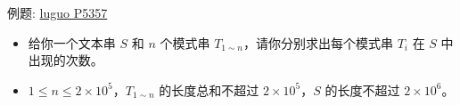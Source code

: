 例题: \href{https://www.luogu.com.cn/problem/P5357}{luguo P5357}
\begin{itemize}
    \item 给你一个文本串 $S$ 和 $n$ 个模式串 $T_{1 \sim n}$，请你分别求出每个模式串 $T_i$ 在 $S$ 中出现的次数。
    \item $1 \le n \le 2 \times {10}^5$，$T_{1 \sim n}$ 的长度总和不超过 $2 \times {10}^5$，$S$ 的长度不超过 $2 \times {10}^6$。
\end{itemize}